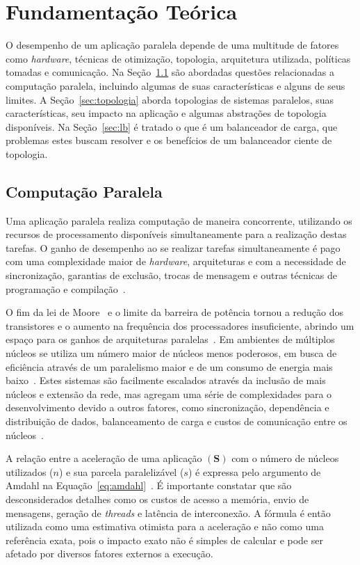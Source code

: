 \chapter{Fundamentação Teórica}
\label{cap:conceituacao}

O desempenho de um aplicação paralela depende de uma multitude de fatores como \textit{hardware}, técnicas de otimização, topologia, arquitetura utilizada, políticas tomadas e comunicação. Na Seção~\ref{sec:parellel} são abordadas questões relacionadas a computação paralela, incluindo algumas de suas características e alguns de seus limites. A Seção~\ref{sec:topologia} aborda topologias de sistemas paralelos, suas características, seu impacto na aplicação e algumas abstrações de topologia disponíveis. Na Seção~\ref{sec:lb} é tratado o que é um balanceador de carga, que problemas estes buscam resolver e os benefícios de um balanceador ciente de topologia.


\section{Computação Paralela}
\label{sec:parellel}

Uma aplicação paralela realiza computação de maneira concorrente, utilizando os recursos de processamento disponíveis simultaneamente para a realização destas tarefas. O ganho de desempenho ao se realizar tarefas simultaneamente é pago com uma complexidade maior de \textit{hardware}, arquiteturas e com a necessidade de sincronização, garantias de exclusão, trocas de mensagem e outras técnicas de programação e compilação~\cite{david-encyclopedia}.

O fim da lei de Moore~\cite{patterson} e o limite da barreira de potência tornou a redução dos transistores e o aumento na frequência dos processadores insuficiente, abrindo um espaço para os ganhos de arquiteturas paralelas~\cite{tanenbaum:operational_systems}. Em ambientes de múltiplos núcleos se utiliza um número maior de núcleos menos poderosos, em busca de eficiência através de um paralelismo maior e de um consumo de energia mais baixo~\cite{snir-encyclopedia}. Estes sistemas são facilmente escalados através da inclusão de mais núcleos e extensão da rede, mas agregam uma série de complexidades para o desenvolvimento devido a outros fatores, como sincronização, dependência e distribuição de dados, balanceamento de carga e custos de comunicação entre os núcleos~\cite{pilla-thesis}.

A relação entre a aceleração de uma aplicação $(\textbf{S})$ com o número de núcleos utilizados ($n$) e sua parcela paralelizável ($s$) é expressa pelo argumento de Amdahl na Equação~\ref{eq:amdahl}~\cite{amdahl}. É importante constatar que são desconsiderados detalhes como os custos de acesso a memória, envio de mensagens, geração de \textit{threads} e latência de interconexão. A fórmula é então utilizada como uma estimativa otimista para a aceleração e não como uma referência exata, pois o impacto exato não é simples de calcular e pode ser afetado por diversos fatores externos a execução.

